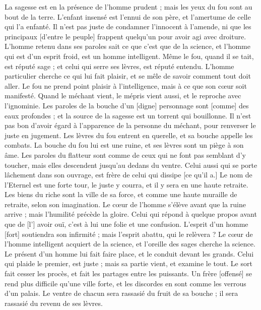 \begin{multicols}{2}
La sagesse est en la présence de l'homme prudent ; mais les yeux du fou sont au bout de la terre.
L'enfant insensé est l'ennui de son père, et l'amertume de celle qui l'a enfanté.
Il n'est pas juste de condamner l'innocent à l'amende, ni que les principaux [d'entre le peuple] frappent quelqu'un pour avoir agi avec droiture.
L'homme retenu dans ses paroles sait ce que c'est que de la science, et l'homme qui est d'un esprit froid, est un homme intelligent.
Même le fou, quand il se tait, est réputé sage ; et celui qui serre ses lèvres, est réputé entendu.
\VerseOne{}L'homme particulier cherche ce qui lui fait plaisir, et se mêle de savoir comment tout doit aller.
Le fou ne prend point plaisir à l'intelligence, mais à ce que son cœur soit manifesté.
Quand le méchant vient, le mépris vient aussi, et le reproche avec l'ignominie.
Les paroles de la bouche d'un [digne] personnage sont [comme] des eaux profondes ; et la source de la sagesse est un torrent qui bouillonne.
Il n'est pas bon d'avoir égard à l'apparence de la personne du méchant, pour renverser le juste en jugement.
Les lèvres du fou entrent en querelle, et sa bouche appelle les combats.
La bouche du fou lui est une ruine, et ses lèvres sont un piège à son âme.
Les paroles du flatteur sont comme de ceux qui ne font pas semblant d'y toucher, mais elles descendent jusqu'au dedans du ventre.
Celui aussi qui se porte lâchement dans son ouvrage, est frère de celui qui dissipe [ce qu'il a.]
Le nom de l'Eternel est une forte tour, le juste y courra, et il y sera en une haute retraite.
Les biens du riche sont la ville de sa force, et comme une haute muraille de retraite, selon son imagination.
Le cœur de l'homme s'élève avant que la ruine arrive ; mais l'humilité précède la gloire.
Celui qui répond à quelque propos avant que de [l'] avoir ouï, c'est à lui une folie et une confusion.
L'esprit d'un homme [fort] soutiendra son infirmité ; mais l'esprit abattu, qui le relèvera ?
Le cœur de l'homme intelligent acquiert de la science, et l'oreille des sages cherche la science.
Le présent d'un homme lui fait faire place, et le conduit devant les grands.
Celui qui plaide le premier, est juste ; mais sa partie vient, et examine le tout.
Le sort fait cesser les procès, et fait les partages entre les puissants.
Un frère [offensé] se rend plus difficile qu'une ville forte, et les discordes en sont comme les verrous d'un palais.
Le ventre de chacun sera rassasié du fruit de sa bouche ; il sera rassasié du revenu de ses lèvres.

\end{multicols}
